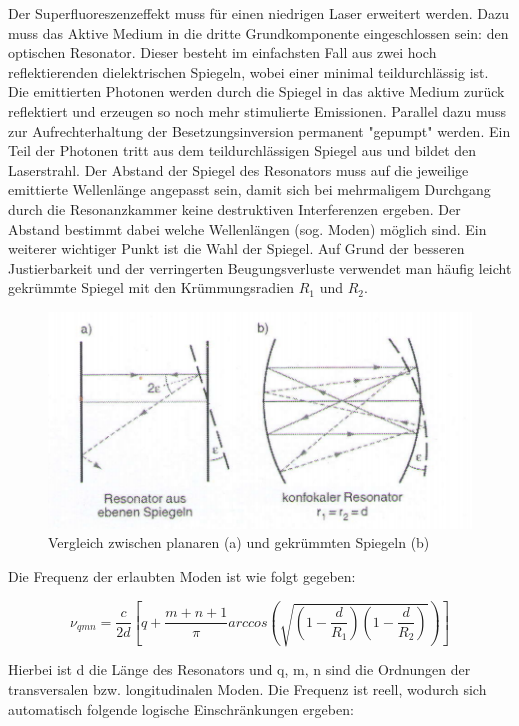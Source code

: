 Der Superfluoreszenzeffekt muss für einen niedrigen Laser erweitert werden. Dazu muss das Aktive Medium in die dritte Grundkomponente eingeschlossen sein: den optischen Resonator. Dieser besteht im einfachsten Fall aus zwei hoch reflektierenden dielektrischen Spiegeln, wobei einer minimal teildurchlässig ist. Die emittierten  Photonen werden durch die Spiegel in das aktive Medium zurück reflektiert und erzeugen so noch mehr stimulierte Emissionen. Parallel dazu muss zur Aufrechterhaltung der Besetzungsinversion permanent "gepumpt" werden. Ein Teil der Photonen tritt aus dem teildurchlässigen Spiegel aus und bildet den Laserstrahl. Der Abstand der Spiegel des Resonators muss auf die jeweilige emittierte Wellenlänge angepasst sein, damit sich bei mehrmaligem Durchgang durch  die Resonanzkammer keine destruktiven Interferenzen ergeben. Der Abstand bestimmt dabei welche Wellenlängen (sog. Moden) möglich sind.
Ein weiterer wichtiger Punkt ist die Wahl der Spiegel. Auf Grund der besseren Justierbarkeit und der verringerten Beugungsverluste verwendet man häufig leicht gekrümmte Spiegel mit den Krümmungsradien $R_1$ und $R_2$. 

\begin{figure}[h]
\begin{center}
\includegraphics[scale=0.7]{img/HNL5}
\caption{Vergleich zwischen planaren (a) und gekrümmten Spiegeln (b)}
\end{center}
\end{figure}

\newpage
Die Frequenz der erlaubten Moden ist wie folgt gegeben:

\begin{equation}
\nu_{qmn}=\frac{c}{2d}\left[q+\frac{m+n+1}{\pi} arccos\left(\sqrt{\left(1-\frac{d}{R_1}\right)\left(1-\frac{d}{R_2}\right)}\right)\right]
\end{equation}

Hierbei ist d die Länge des Resonators und q, m, n sind die Ordnungen der transversalen bzw. longitudinalen Moden. Die Frequenz ist reell, wodurch sich automatisch folgende logische Einschränkungen ergeben:

